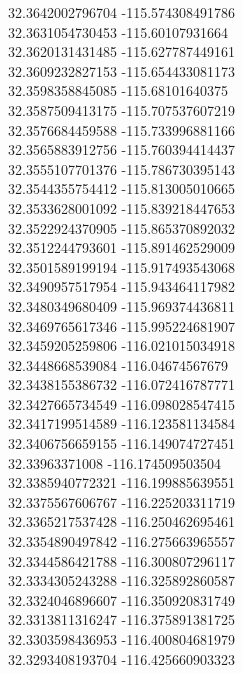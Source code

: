 {32.3642002796704	-115.574308491786\\
32.3631054730453	-115.60107931664\\
32.3620131431485	-115.627787449161\\
32.3609232827153	-115.654433081173\\
32.3598358845085	-115.68101640375\\
32.3587509413175	-115.707537607219\\
32.3576684459588	-115.733996881166\\
32.3565883912756	-115.760394414437\\
32.3555107701376	-115.786730395143\\
32.3544355754412	-115.813005010665\\
32.3533628001092	-115.839218447653\\
32.3522924370905	-115.865370892032\\
32.3512244793601	-115.891462529009\\
32.3501589199194	-115.917493543068\\
32.3490957517954	-115.943464117982\\
32.3480349680409	-115.969374436811\\
32.3469765617346	-115.995224681907\\
32.3459205259806	-116.021015034918\\
32.3448668539084	-116.04674567679\\
32.3438155386732	-116.072416787771\\
32.3427665734549	-116.098028547415\\
32.3417199514589	-116.123581134584\\
32.3406756659155	-116.149074727451\\
32.33963371008	-116.174509503504\\
32.3385940772321	-116.199885639551\\
32.3375567606767	-116.225203311719\\
32.3365217537428	-116.250462695461\\
32.3354890497842	-116.275663965557\\
32.3344586421788	-116.300807296117\\
32.3334305243288	-116.325892860587\\
32.3324046896607	-116.350920831749\\
32.3313811316247	-116.375891381725\\
32.3303598436953	-116.400804681979\\
32.3293408193704	-116.425660903323\\
}
